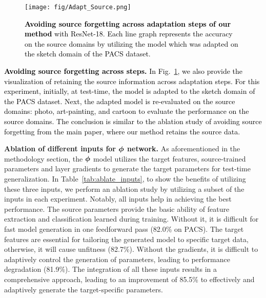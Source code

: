 \begin{figure}[t]
    \vspace{5mm}
    \centering
    \texttt{[image: fig/Adapt\_Source.png]}
    \caption{\textcolor{black}{\textbf{Avoiding source forgetting across adaptation steps of our method} with ResNet-18. Each line graph represents the accuracy on the source domains by utilizing the model which was adapted on the sketch domain of the PACS dataset.  }}
    \vspace{-2mm}
    \label{fig:source_forget}
    
\end{figure}




\noindent\textcolor{black}{\noindent\textbf{Avoiding source forgetting across steps. }
In Fig.~\ref{fig:source_forget}, we also provide the visualization of retaining the source information across adaptation steps. For this experiment, initially, at test-time, the model is adapted to the sketch domain of the PACS dataset. Next, the adapted model is re-evaluated on the source domains: photo, art-painting, and cartoon to evaluate the performance on the source domains. The conclusion is similar to the ablation study of avoiding source forgetting from the main paper, where our method retains the source data.} 


\noindent\textbf{Ablation of different inputs for $\boldsymbol{\phi}$ network.} 
As aforementioned in the methodology section, the $\boldsymbol{\phi}$ model utilizes the target features, source-trained parameters and layer gradients to generate the target parameters for test-time generalization. In Table~\ref{tab:ablate_inputs}, to show the benefits of utilizing these three inputs, we perform an ablation study by utilizing a subset of the inputs in each experiment. Notably, all inputs help in achieving the best performance. 
The source parameters provide the basic ability of feature extraction and classification learned during training. Without it, it is difficult for fast model generation in one feedforward pass (82.0\% on PACS). The target features are essential for tailoring the generated model to specific target data, otherwise, it will cause unfitness (82.7\%). Without the gradients, it is difficult to adaptively control the generation of parameters, leading to performance degradation (81.9\%). The integration of all these inputs results in a comprehensive approach, leading to an improvement of 85.5\% to effectively and adaptively generate the target-specific parameters.\\



